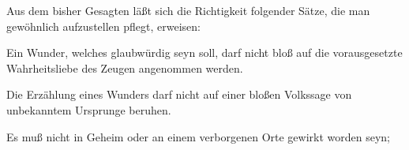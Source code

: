 Aus dem bisher Gesagten läßt sich die Richtigkeit folgender Sätze, die man gewöhnlich aufzustellen pflegt, erweisen:
\begin{aufza}
\item  Ein Wunder, welches glaubwürdig seyn soll, darf nicht bloß auf die vorausgesetzte Wahrheitsliebe des Zeugen angenommen werden.
\item  Die Erzählung eines Wunders darf nicht auf einer bloßen Volkssage von unbekanntem Ursprunge beruhen.
\item  Es muß nicht in Geheim oder an einem verborgenen Orte gewirkt worden seyn; \usw
\end{aufza}

